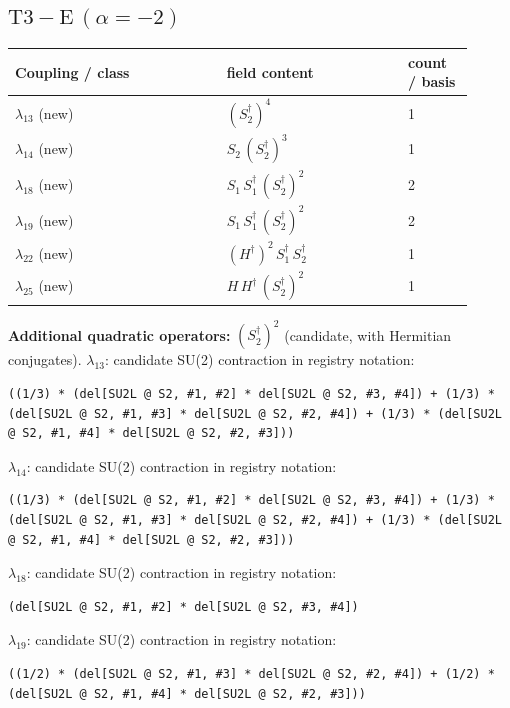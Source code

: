\documentclass[9pt,a4paper]{article}
\begin{document}
\subsection*{$ \mathrm{T3-E}\,(\alpha=-2) $}
\begin{longtable}{@{}p{0.42\linewidth}p{0.36\linewidth}p{0.13\linewidth}@{}}
\toprule
Coupling / class & field content & count / basis\\
\midrule
\endhead
$\lambda_{13}$ (new) & $\left(S_2^\dagger\right)^{4}$ & 1 \\
$\lambda_{14}$ (new) & $S_2\, \left(S_2^\dagger\right)^{3}$ & 1 \\
$\lambda_{18}$ (new) & $S_1\, S_1^\dagger\, \left(S_2^\dagger\right)^{2}$ & 2 \\
$\lambda_{19}$ (new) & $S_1\, S_1^\dagger\, \left(S_2^\dagger\right)^{2}$ & 2 \\
$\lambda_{22}$ (new) & $\left(H^\dagger\right)^{2}\, S_1^\dagger\, S_2^\dagger$ & 1 \\
$\lambda_{25}$ (new) & $H\, H^\dagger\, \left(S_2^\dagger\right)^{2}$ & 1 \\
\bottomrule
\end{longtable}
\textbf{Additional quadratic operators:}
$\left(S_2^\dagger\right)^{2}$ (candidate, with Hermitian conjugates).
\textbf{$ \lambda_{13} $}: candidate SU(2) contraction in registry notation:
\begin{lstlisting}[mathescape=true]
((1/3) * (del[SU2L @ S2, #1, #2] * del[SU2L @ S2, #3, #4]) + (1/3) * (del[SU2L @ S2, #1, #3] * del[SU2L @ S2, #2, #4]) + (1/3) * (del[SU2L @ S2, #1, #4] * del[SU2L @ S2, #2, #3]))
\end{lstlisting}

\textbf{$ \lambda_{14} $}: candidate SU(2) contraction in registry notation:
\begin{lstlisting}[mathescape=true]
((1/3) * (del[SU2L @ S2, #1, #2] * del[SU2L @ S2, #3, #4]) + (1/3) * (del[SU2L @ S2, #1, #3] * del[SU2L @ S2, #2, #4]) + (1/3) * (del[SU2L @ S2, #1, #4] * del[SU2L @ S2, #2, #3]))
\end{lstlisting}

\textbf{$ \lambda_{18} $}: candidate SU(2) contraction in registry notation:
\begin{lstlisting}[mathescape=true]
(del[SU2L @ S2, #1, #2] * del[SU2L @ S2, #3, #4])
\end{lstlisting}

\textbf{$ \lambda_{19} $}: candidate SU(2) contraction in registry notation:
\begin{lstlisting}[mathescape=true]
((1/2) * (del[SU2L @ S2, #1, #3] * del[SU2L @ S2, #2, #4]) + (1/2) * (del[SU2L @ S2, #1, #4] * del[SU2L @ S2, #2, #3]))
\end{lstlisting}
\end{document}
